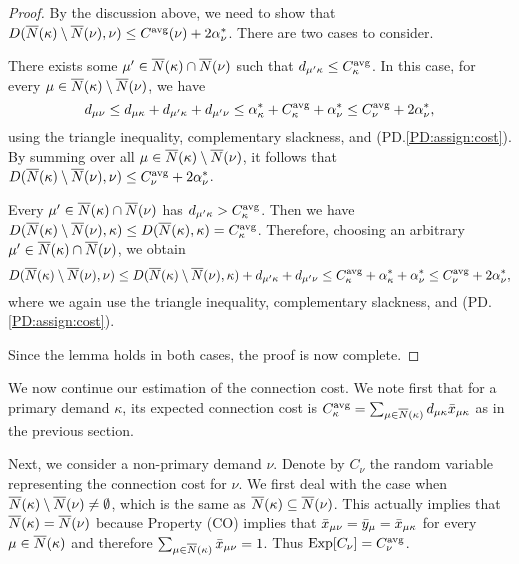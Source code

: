\begin{proof}
  By the discussion above, we need to show that $D({\overline{N}}(\kappa)
  \setminus {\overline{N}}(\nu), \nu) \leq C^{{\mbox{\scriptsize\rm avg}}}(\nu) +
  2\alpha_{\nu}^\ast$. There are two cases to consider.

\begin{description}
%	
\item{}
	 There exists some $\mu'\in {\overline{N}}(\kappa) \cap
  {\overline{N}}(\nu)$ such that $d_{\mu' \kappa} \leq C^{{\mbox{\scriptsize\rm avg}}}_\kappa$.
In this case, for every $\mu\in {\overline{N}}(\kappa)\setminus {\overline{N}}(\nu)$, we have
%
\begin{equation*}
d_{\mu \nu} \leq d_{\mu \kappa} + d_{\mu' \kappa} + d_{\mu' \nu}  
 	\le  \alpha^\ast_\kappa + C^{{\mbox{\scriptsize\rm avg}}}_\kappa + \alpha^\ast_{\nu}
  \leq C^{{\mbox{\scriptsize\rm avg}}}_\nu + 2\alpha_{\nu}^\ast,
\end{equation*}
%
using the triangle inequality, complementary slackness, and (PD.\ref{PD:assign:cost}).
By summing over all $\mu\in {\overline{N}}(\kappa) \setminus {\overline{N}}(\nu)$, it
follows that $D({\overline{N}}(\kappa) \setminus {\overline{N}}(\nu), \nu) \leq
C^{{\mbox{\scriptsize\rm avg}}}_\nu + 2\alpha_{\nu}^\ast$.

\item{}
 Every $\mu'\in {\overline{N}}(\kappa)\cap {\overline{N}}(\nu)$
has $d_{\mu'\kappa} > C^{{\mbox{\scriptsize\rm avg}}}_\kappa$. Then we
have $D({\overline{N}}(\kappa) \setminus {\overline{N}}(\nu),\kappa)\leq
D({\overline{N}}(\kappa),\kappa)=C^{{\mbox{\scriptsize\rm avg}}}_{\kappa}$. Therefore,
choosing an arbitrary $\mu'\in {\overline{N}}(\kappa)\cap {\overline{N}}(\nu)$,
we obtain
%
\begin{equation*}
  D({\overline{N}}(\kappa) \setminus {\overline{N}}(\nu), \nu) 
	\leq  D({\overline{N}}(\kappa) \setminus {\overline{N}}(\nu), \kappa) 
			+ d_{\mu' \kappa} + d_{\mu' \nu} 
	\leq  C^{{\mbox{\scriptsize\rm avg}}}_{\kappa} +
  \alpha_{\kappa}^\ast + \alpha_{\nu}^\ast
	\leq C^{{\mbox{\scriptsize\rm avg}}}_\nu + 2\alpha_{\nu}^\ast,
\end{equation*}
%
where we again use the triangle inequality,
complementary slackness, and  (PD.\ref{PD:assign:cost}).
%
\end{description}
%
Since the lemma holds in both cases, the proof is now complete.
\end{proof}

We now continue our estimation of the connection cost. We note first
that for a primary demand $\kappa$, its expected connection cost
is $C^{\mbox{\scriptsize\rm avg}}_{\kappa} = \sum_{\mu\in{\overline{N}}(\kappa)}
d_{\mu\kappa}{\bar x}_{\mu\kappa}$ as in the previous section.

Next, we consider a non-primary demand $\nu$.
Denote by $C_\nu$ the random variable representing the connection
cost for $\nu$. We first deal with the case when
${\overline{N}}(\kappa)\setminus {\overline{N}}(\nu)\neq\emptyset$, which is the
same as ${\overline{N}}(\kappa) \subseteq {\overline{N}}(\nu)$. This
actually implies that ${\overline{N}}(\kappa) = {\overline{N}}(\nu)$ because
Property (CO) implies that ${\bar x}_{\mu\nu} = {\bar y}_{\mu} =
{\bar x}_{\mu\kappa}$ for every $\mu \in {\overline{N}}(\kappa)$ and
therefore $\sum_{\mu\in{\overline{N}}(\kappa)} {\bar x}_{\mu\nu} =
1$. Thus $\mbox{\rm Exp}[C_{\nu}] = C^{{\mbox{\scriptsize\rm avg}}}_{\nu}$. 

